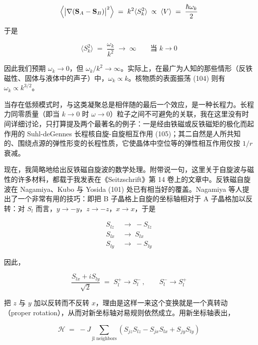\begin{equation*}
\Bigl\langle\bigl|\nabla(\mathbf{S}_A - \mathbf{S}_B)\bigr|^2\Bigr\rangle \;=\; k^2\langle S_k^2\rangle \;\propto\; \langle V\rangle \;=\; \frac{\hbar\omega_k}{2}
\end{equation*}

于是

\begin{equation*}
\langle S_k^2\rangle \;=\; \frac{\omega_k}{k^2} \;\to\; \infty \qquad\text{当 } k\to 0
\end{equation*}

因此我们预期 $\omega_k\to 0$，但 $\omega_k/k^2\to\infty$。实际上，在最广为人知的那些情形（反铁磁性、固体与液体中的声子）中，$\omega_k\propto k$。核物质的表面振荡 (104) 则有 $\omega_k\propto k^{3/2}$。

当存在低频模式时，与这类凝聚总是相伴随的最后一个效应，是一种长程力。长程力同零质量（即当 $k\to 0$ 时 $\omega\to 0$）粒子之间不可避免的关联，我在这里没有时间详细讨论，只打算提及两个最著名的例子：一是经由铁磁或反铁磁矩的极化而起作用的 Suhl-deGennes 长程核自旋-自旋相互作用 (105)；其二自然是人所共知的、围绕点源的弹性形变的长程性质，它使晶体中空位等的弹性相互作用仅按 $1/r$ 衰减。

现在，我简略地给出反铁磁自旋波的数学处理。附带说一句，这里关于自旋波与磁性的许多材料，都载于我发表在《Seitzschrift》第 14 卷上的文章中。反铁磁自旋波在 Nagamiya、Kubo 与 Yosida (101) 处已有相当好的覆盖。Nagamiya 等人提出了一个非常有用的技巧：即把 B 子晶格上自旋的坐标轴相对于 A 子晶格加以反转：对 $S_l$ 而言，$y\to -y$，$z\to -z$，$x\to x$，于是

\begin{align*}
S_{lz} \;&\to\; -S_{lz}\\
S_{lx} \;&\to\; S_{lx}\\
S_{ly} \;&\to\; -S_{ly}
\end{align*}

因此，

\begin{equation*}
\frac{S_{lx}+iS_{ly}}{\sqrt{2}} \;=\; S_l^+ \longrightarrow S_l^-\,,\qquad S_l^- \longrightarrow S_l^+
\end{equation*}

把 $z$ 与 $y$ 加以反转而不反转 $x$，理由是这样一来这个变换就是一个真转动（proper rotation），从而对新坐标轴对易规则依然成立。用新坐标轴表出，

\begin{equation*}
\mathcal{H} \;=\; -J\sum_{\text{jl neighbors}} \left(S_{jz}S_{lz} - S_{jx}S_{lx} + S_{jy}S_{ly}\right)
\end{equation*}


